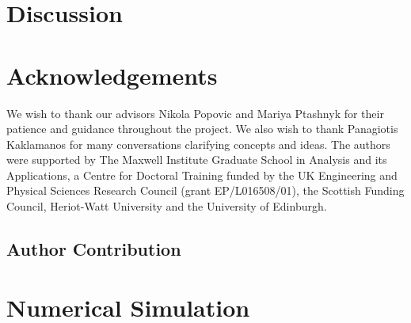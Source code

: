 \documentclass[11pt]{article}
\begin{document}
\section{Discussion}

\section{Acknowledgements}
We wish to thank our advisors Nikola Popovic and Mariya Ptashnyk for their patience and guidance throughout the project. We also wish to thank Panagiotis Kaklamanos for many conversations clarifying concepts and ideas. 
The authors were supported by The Maxwell Institute Graduate School in Analysis and its
Applications, a Centre for Doctoral Training funded by the UK Engineering and Physical
Sciences Research Council (grant EP/L016508/01), the Scottish Funding Council, Heriot-Watt
University and the University of Edinburgh.

\subsection{Author Contribution}

\newpage


\nocite{strogatz2007nonlinear}

\newpage
\appendix
%
%
%
\section{Numerical Simulation}\label{app:NumSim}

\end{document}
